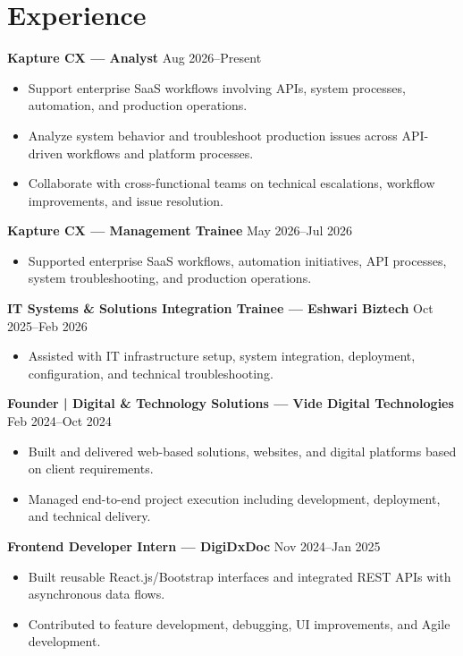 \documentclass[a4paper,9pt]{article}
\begin{document}
\section{Experience}

\textbf{Kapture CX --- Analyst}
\hfill Aug 2026--Present
\begin{itemize}
    \item Support enterprise SaaS workflows involving APIs, system processes,
    automation, and production operations.
    \item Analyze system behavior and troubleshoot production issues across
    API-driven workflows and platform processes.
    \item Collaborate with cross-functional teams on technical escalations,
    workflow improvements, and issue resolution.
\end{itemize}

\textbf{Kapture CX --- Management Trainee}
\hfill May 2026--Jul 2026
\begin{itemize}
    \item Supported enterprise SaaS workflows, automation initiatives,
    API processes, system troubleshooting, and production operations.
\end{itemize}

\textbf{IT Systems \& Solutions Integration Trainee --- Eshwari Biztech}
\hfill Oct 2025--Feb 2026
\begin{itemize}
    \item Assisted with IT infrastructure setup, system integration,
    deployment, configuration, and technical troubleshooting.
\end{itemize}

\textbf{Founder | Digital \& Technology Solutions --- Vide Digital Technologies}
\hfill Feb 2024--Oct 2024
\begin{itemize}
    \item Built and delivered web-based solutions, websites, and digital
    platforms based on client requirements.
    \item Managed end-to-end project execution including development,
    deployment, and technical delivery.
\end{itemize}

\textbf{Frontend Developer Intern --- DigiDxDoc}
\hfill Nov 2024--Jan 2025
\begin{itemize}
    \item Built reusable React.js/Bootstrap interfaces and integrated REST APIs
    with asynchronous data flows.
    \item Contributed to feature development, debugging, UI improvements,
    and Agile development.
\end{itemize}
\end{document}
